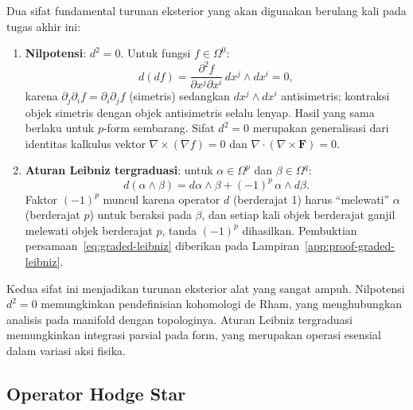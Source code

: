 Dua sifat fundamental turunan eksterior yang akan digunakan berulang kali pada tugas akhir ini:
\begin{enumerate}[label=\roman*.]
    \item \textbf{Nilpotensi}: $d^2 = 0$. Untuk fungsi $f \in \Omega^0$:
    \begin{equation}\label{eq:d-squared}
        d(df) = \frac{\partial^2 f}{\partial x^j \partial x^i}\, dx^j \wedge dx^i = 0,
    \end{equation}
    karena $\partial_j\partial_i f = \partial_i\partial_j f$ (simetris) sedangkan $dx^j \wedge dx^i$ antisimetris; kontraksi objek simetris dengan objek antisimetris selalu lenyap. Hasil yang sama berlaku untuk $p$-form sembarang. Sifat $d^2 = 0$ merupakan generalisasi dari identitas kalkulus vektor $\nabla \times (\nabla f) = 0$ dan $\nabla \cdot (\nabla \times \mathbf{F}) = 0$.

    \item \textbf{Aturan Leibniz tergraduasi}: untuk $\alpha \in \Omega^p$ dan $\beta \in \Omega^q$:
    \begin{equation}\label{eq:graded-leibniz}
        d(\alpha \wedge \beta) = d\alpha \wedge \beta + (-1)^p\, \alpha \wedge d\beta.
    \end{equation}
    Faktor $(-1)^p$ muncul karena operator $d$ (berderajat 1) harus ``melewati'' $\alpha$ (berderajat $p$) untuk beraksi pada $\beta$, dan setiap kali objek berderajat ganjil melewati objek berderajat $p$, tanda $(-1)^p$ dihasilkan. Pembuktian persamaan~\eqref{eq:graded-leibniz} diberikan pada Lampiran~\ref{app:proof-graded-leibniz}.
\end{enumerate}

Kedua sifat ini menjadikan turunan eksterior alat yang sangat ampuh. Nilpotensi $d^2 = 0$ memungkinkan pendefinisian kohomologi de Rham, yang menghubungkan analisis pada manifold dengan topologinya. Aturan Leibniz tergraduasi memungkinkan integrasi parsial pada form, yang merupakan operasi esensial dalam variasi aksi fisika.

\subsection{Operator Hodge Star}
\label{subsec:hodge-star}

